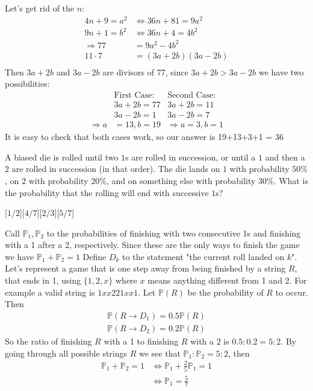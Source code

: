 \begin{solution}[D]
     Let's get rid of the $n$:
    \begin{align*}
        4n+9=a^2 &\iff 36n+81=9a^2 \\
        9n+1 = b^2 &\iff 36n+4=4b^2 \\
        \Rightarrow77 &= 9a^2-4b^2 
        \\11\cdot 7&=(3a+2b)(3a-2b) \\
    \end{align*}
    Then $3a+2b$ and $3a-2b$ are divisors of 77, since $3a+2b>3a-2b$ we have two possibilities:
    \begin{align*}
        &\text{First Case: }  &\text{Second Case: }  \\
        &3a+2b=77                &3a+2b=11\\
        &3a-2b=1                 &3a-2b=7\\
        \Rightarrow a&=13,b=19  &\Rightarrow a=3,b=1
    \end{align*}
    It is easy to check that both cases work, so our answer is 19+13+3+1 = $\boxed{36}$
\end{solution}

\begin{problem}
     A biased die is rolled until two $1$s are rolled in succession, or until a $1$ and then a $2$ are rolled in succession (in that order). The die lands on $1$ with probability $50\%$, on $2$ with probability $20\%$, and on something else with probability $30\%$. What is the probability that the rolling will end with successive $1$s?
\end{problem}
[$1/2$][$4/7$][$2/3$][$5/7$]

\begin{solution}[E]
    Call $\mathbb{P}_1, \mathbb{P}_2$ to the probabilities of finishing with two consecutive 1s and finishing with a 1 after a 2, respectively. Since these are the only ways to finish the game we have $\mathbb{P}_1+\mathbb{P}_2=1$ Define $D_k$ to the statement "the current roll landed on $k$". Let's represent a game that is one step away from being finished by a string $R$, that ends in 1, using $\{1,2,x\}$ where $x$ means anything different from 1 and 2. For example a valid string is $1xx221xx1$. Let $\mathbb{P}(R)$ be the probability of $R$ to occur. Then 
    \begin{align*}
        \mathbb{P}(R \rightarrow D_1) = 0.5\mathbb{P}(R)\\
        \mathbb{P}(R \rightarrow D_2) = 0.2\mathbb{P}(R)
    \end{align*}
    So the ratio of finishing $R$ with a 1 to finishing $R$ with a 2 is $0.5 : 0.2 = 5:2$. By going through all possible strings $R$ we see that $\mathbb{P}_1 : \mathbb{P}_2 = 5:2$, then 
    \begin{align*}
        \mathbb{P}_1+\mathbb{P}_2 = 1 &\iff \mathbb{P}_1+\frac{2}{5}\mathbb{P}_1=1 \\
        &\iff \mathbb{P}_1 = \boxed{\frac{5}{7}}
    \end{align*}
\end{solution}

